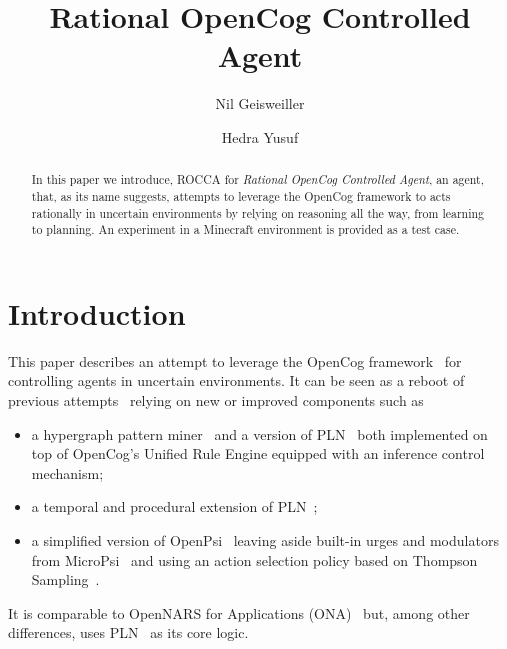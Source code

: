 \documentclass[runningheads]{llncs}
\begin{document}
%
\title{Rational OpenCog Controlled Agent}

%
\author{Nil Geisweiller
  \and Hedra Yusuf}
%
%
%
\maketitle              %
%

\begin{abstract}
  In this paper we introduce, ROCCA for \emph{Rational OpenCog
    Controlled Agent}, an agent, that, as its name suggests, attempts
  to leverage the OpenCog framework to acts rationally in uncertain
  environments by relying on reasoning all the way, from learning to
  planning.  An experiment in a Minecraft environment is provided as a
  test case.

\end{abstract}

\section{Introduction}
This paper describes an attempt to leverage the OpenCog
framework~\cite{Hart2008} for controlling agents in uncertain
environments.  It can be seen as a reboot of previous
attempts~\cite{Goertzel2008, Goertzel2011CSP, Cai2013}
relying on new or improved components such as
\begin{itemize}
\item a hypergraph pattern miner~\cite{Geisweiller2019} and a version
  of PLN~\cite{Goertzel2009} both implemented on top of OpenCog's
  Unified Rule Engine equipped with an inference control mechanism;
\item a temporal and procedural extension of
  PLN~\cite{Geisweiller2023TPLN};
\item a simplified version of OpenPsi~\cite{Cai2013} leaving
  aside built-in urges and modulators from MicroPsi~\cite{Bach2012}
  and using an action selection policy based on Thompson
  Sampling~\cite{Leike2016}.
\end{itemize}
It is comparable to OpenNARS for Applications (ONA)~\cite{Hammer2020}
but, among other differences, uses PLN~\cite{Goertzel2009} as its core
logic.
\end{document}
